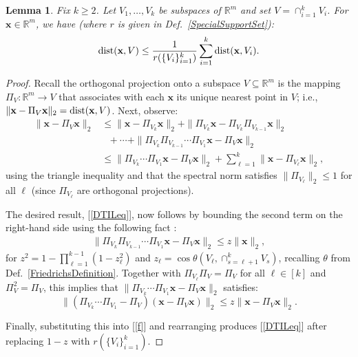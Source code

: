 \documentclass[9pt,twocolumn]{pnas-new}
\newtheorem{lemma}{Lemma}
\renewcommand{\eqref}[1]{\textnormal{[\ref{#1}]}}
\begin{document}
\begin{lemma}\label{DistanceToIntersectionLemma}
Fix $k \geq 2$. Let $V_1, \ldots, V_k$ be subspaces of $\mathbb{R}^m$ and set $V = \cap_{i = 1}^k V_i$. For  $\mathbf{x} \in \mathbb{R}^m$, we have (where $r$ is given in Def.~\ref{SpecialSupportSet}):
\begin{align}\label{DTILeq}
\text{\rm dist}(\mathbf{x}, V) \leq \frac{1}{r(\{V_i\}_{i = 1}^k)} \sum_{i=1}^k \text{\rm dist}(\mathbf{x}, V_i).
\end{align}
\end{lemma}
\begin{proof} 
Recall the orthogonal projection onto a subspace $V \subseteq \mathbb{R}^m$ is the mapping $\Pi_V: \mathbb{R}^m \to V$ that associates with each $\mathbf{x}$ its unique nearest point in $V$; i.e., $\|\mathbf{x} - \Pi_V\mathbf{x}\|_2 = \text{\rm dist}(\mathbf{x}, V)$.
Next, observe:
\begin{align}\label{f}
\|\mathbf{x} - \Pi_V\mathbf{x}\|_2 &\leq \|\mathbf{x} - \Pi_{V_k} \mathbf{x}\|_2 + \|\Pi_{V_k}  \mathbf{x} - \Pi_{V_k}\Pi_{V_{k-1}}\mathbf{x}\|_2 \nonumber \\
&\ \ \ + \cdots + \|\Pi_{V_k} \Pi_{V_{k-1}}\cdots \Pi_{V_1} \mathbf{x} - \Pi_V \mathbf{x}\|_2 \nonumber \\
&\leq \|\Pi_{V_k}\cdots\Pi_{V_{1}} \mathbf{x} - \Pi_V \mathbf{x}\|_2 + \sum_{\ell=1}^k \|\mathbf{x} - \Pi_{V_{\ell}} \mathbf{x}\|_2,
\end{align}
using the triangle inequality and that the spectral norm satisfies $\|\Pi_{V_{\ell}}\|_2 \leq 1$ for all $\ell$ (since $\Pi_{V_{\ell}}$ are orthogonal projections).

The desired result, \eqref{DTILeq}, now follows by bounding the second term on the right-hand side using the following fact \cite[Thm.~9.33]{Deutsch12}:
\begin{align}
\|\Pi_{V_k}\Pi_{V_{k-1}}\cdots\Pi_{V_1} \mathbf{x} - \Pi_V\mathbf{x}\|_2 \leq z \|\mathbf{x}\|_2,
\end{align}
for \mbox{$z^2= 1 - \prod_{\ell =1}^{k-1}(1-z_{\ell}^2)$} and \mbox{$z_{\ell} = \cos\theta\left(V_{\ell}, \cap_{s=\ell+1}^k V_s\right)$}, recalling $\theta$ from Def.~\ref{FriedrichsDefinition}. Together with $\Pi_{V_\ell} \Pi_V = \Pi_V$ for all $\ell \in [k]$ and $\Pi_V^2 = \Pi_V$, this implies that $\|\Pi_{V_k} \cdots \Pi_{V_1}\mathbf{x}  - \Pi_V \mathbf{x} \|_2$ satisfies:
\[\| ( \Pi_{V_k} \cdots\Pi_{V_1} - \Pi_V ) (\mathbf{x} - \Pi_V\mathbf{x})\|_2 \leq z\|\mathbf{x} - \Pi_V\mathbf{x}\|_2.\]

Finally, substituting this into \eqref{f} and rearranging produces \eqref{DTILeq} after replacing $1 - z$ with $r(\{V_i\}_{i=1}^k)$.
\end{proof}
\end{document}
